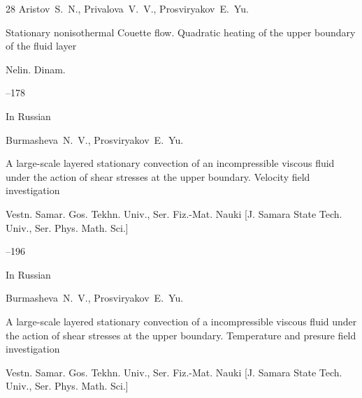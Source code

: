 \begin{thebibliography}{28}
\by Aristov~S.~N., Privalova~V.~V., Prosviryakov~E.~Yu.

\paper Stationary nonisothermal Couette flow. Quadratic heating of the upper boundary of the fluid layer

\jour Nelin. Dinam.




--178




\lang In Russian




\by Burmasheva~N.~V., Prosviryakov~E.~Yu.

\paper A large-scale layered stationary convection of an incompressible viscous fluid under the action of shear stresses at the upper boundary. Velocity field investigation

\jour Vestn. Samar. Gos. Tekhn. Univ., Ser. Fiz.-Mat. Nauki \rm [J. Samara State Tech. Univ., Ser. Phys. Math. Sci.]




--196




\lang In Russian




\by Burmasheva~N.~V., Prosviryakov~E.~Yu.

\paper A large-scale layered stationary convection of a incompressible viscous fluid under the action of shear stresses at the upper boundary. Temperature and presure field investigation

\jour Vestn. Samar. Gos. Tekhn. Univ., Ser. Fiz.-Mat. Nauki \rm [J. Samara State Tech. Univ., Ser. Phys. Math. Sci.]





\end{thebibliography}
